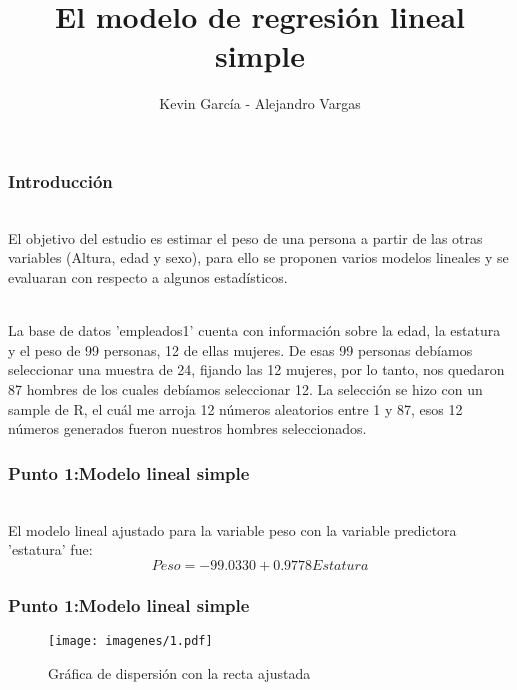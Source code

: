 \documentclass[12pt]{beamer}
\author{Kevin García - Alejandro Vargas}
\title{El modelo de regresión lineal simple}
\begin{document}
\begin{frame}
\titlepage
\end{frame}

\begin{frame}
\frametitle{Introducción}
~\\El objetivo del estudio es estimar el peso de una persona a partir de las otras variables (Altura, edad y
sexo), para ello se proponen varios modelos lineales y se evaluaran con respecto a algunos estadísticos.

~\\La base de datos 'empleados1' cuenta con información sobre la edad, la estatura y el peso
de 99 personas, 12 de ellas mujeres. De esas 99 personas debíamos seleccionar una muestra de 24, fijando las 12 mujeres, por lo tanto, nos quedaron 87 hombres de los cuales debíamos seleccionar 12. La selección se hizo con un sample de R, el cuál me arroja 12 números aleatorios entre 1 y 87, esos 12 números generados fueron nuestros hombres seleccionados.
\end{frame}

\begin{frame}
\frametitle{Punto 1:Modelo lineal simple}
~\\ El modelo lineal ajustado para la variable peso con la variable predictora 'estatura' fue:
~\\ $$Peso=-99.0330+0.9778 Estatura$$
\end{frame}
\begin{frame}
\frametitle{Punto 1:Modelo lineal simple}
\begin{figure}[!h]
    \begin{center}
        \texttt{[image: imagenes/1.pdf]}
        \caption{Gráfica de dispersión con la recta ajustada}
        \label{fig:Densidad}
    \end{center}
\end{figure}
\end{frame}
\end{document}
